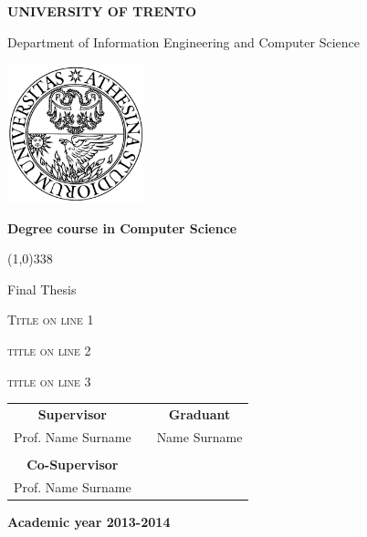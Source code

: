 \begin{titlepage}
	\pagestyle{empty}

	\begin{center}
		{\bfseries\Large {\huge U}NIVERSITY OF {\huge T}RENTO}

		\vspace{0.2cm}

		{\Large Department of Information Engineering and Computer Science}

		\vspace{0.5cm}

		\begin{center}
			\includegraphics[width=0.3\textwidth]{img/unitn.png}
		\end{center}

		\vspace{0.5cm}

		{\bfseries \Large Degree course in Computer Science}

		\vspace{0.3cm}
		\line(1,0){338}
		\vspace{0.3cm}

		{\Large Final Thesis}

		\vspace{2.0cm}

		{\huge \textsc{Title on line 1}}

		\vspace{0.2cm}
		
		{\huge \textsc{title on line 2}}

		\vspace{0.2cm}
		
		{\huge \textsc{title on line 3}}

		\vspace{2.0cm}

		\large
		\begin{center}
			\begin{tabular}{ccc}
				{\bfseries Supervisor} & \hspace{5cm} & {\bfseries Graduant} \\
				Prof. Name Surname & \hspace{5cm} & Name Surname \\ \\
				{\bfseries Co-Supervisor} \\ Prof. Name Surname
			\end{tabular}
		\end{center}
		\vspace{2.0cm}

		{\bfseries \large Academic year 2013-2014}
		\vfill

	\end{center}

\end{titlepage}
